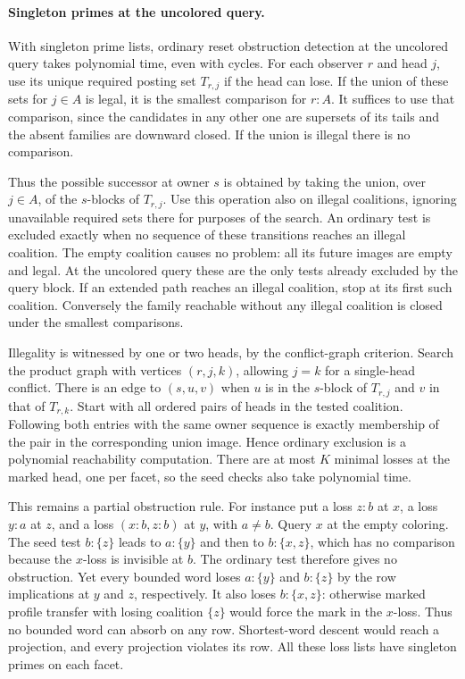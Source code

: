 \paragraph{Singleton primes at the uncolored query.}
With singleton prime lists, ordinary reset
obstruction detection at the uncolored query
takes polynomial time, even with cycles.
For each observer $r$ and head $j$, use its
unique required posting set $T_{r,j}$ if
the head can lose. If the union of these sets
for $j\in A$ is legal, it is the smallest
comparison for $r:A$. It suffices to use
that comparison, since the candidates in any
other one are supersets of its tails and the
absent families are downward closed. If the
union is illegal there is no comparison.

Thus the possible successor at owner $s$ is
obtained by taking the union, over $j\in A$,
of the $s$-blocks of $T_{r,j}$. Use this
operation also on illegal coalitions, ignoring
unavailable required sets there for purposes
of the search. An ordinary test is excluded
exactly when no sequence of these transitions
reaches an illegal coalition. The empty
coalition causes no problem: all its future
images are empty and legal. At the uncolored
query these are the only tests already
excluded by the query block. If an extended
path reaches an illegal coalition, stop at
its first such coalition. Conversely the
family reachable without any illegal
coalition is closed under the smallest
comparisons.

Illegality is witnessed by one or two heads,
by the conflict-graph criterion. Search the
product graph with vertices $(r,j,k)$,
allowing $j=k$ for a single-head conflict.
There is an edge to $(s,u,v)$ when $u$ is
in the $s$-block of $T_{r,j}$ and $v$ in
that of $T_{r,k}$. Start with all ordered
pairs of heads in the tested coalition.
Following both entries with the same owner
sequence is exactly membership of the pair
in the corresponding union image. Hence
ordinary exclusion is a polynomial
reachability computation. There are at
most $K$ minimal losses at the marked
head, one per facet, so the seed checks
also take polynomial time.

This remains a partial obstruction rule.
For instance put a loss $z{:}b$ at $x$,
a loss $y{:}a$ at $z$, and a loss
$(x{:}b,z{:}b)$ at $y$, with $a\ne b$.
Query $x$ at the empty coloring. The seed
test $b:\{z\}$ leads to $a:\{y\}$ and then
to $b:\{x,z\}$, which has no comparison
because the $x$-loss is invisible at $b$.
The ordinary test therefore gives no
obstruction. Yet every bounded word loses
$a:\{y\}$ and $b:\{z\}$ by the row
implications at $y$ and $z$, respectively.
It also loses $b:\{x,z\}$: otherwise marked
profile transfer with losing coalition
$\{z\}$ would force the mark in the
$x$-loss. Thus no bounded word can absorb
on any row. Shortest-word descent would
reach a projection, and every projection
violates its row. All these loss lists
have singleton primes on each facet.


